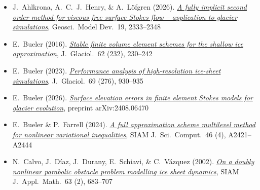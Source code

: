 
\let\plainhref\href
\renewcommand{\href}[2]{\plainhref{#1}{\textcolor{icBlue}{#2}}}

\setlength{\leftmargini}{1em}  %
\begin{itemize}\setlength{\itemsep}{2pt}
\footnotesize
\item J.~Ahlkrona, A.~C.~J.~Henry, \& A.~L\"ofgren (2026). \href{https://doi.org/10.5194/gmd-19-2333-2026}{\emph{A fully implicit second order method for viscous free surface Stokes flow -- application to glacier simulations}}, Geosci.~Model Dev.~19, 2333--2348

\item E.~Bueler (2016). \href{https://doi.org/10.1017/jog.2015.3}{\emph{Stable finite volume element schemes for the shallow ice approximation}}, J.~Glaciol.~62 (232), 230--242


\item E.~Bueler (2023). \href{https://doi.org/10.1017/jog.2022.113}{\emph{Performance analysis of high-resolution ice-sheet simulations}}, J.~Glaciol.~69 (276), 930--935

\item E.~Bueler (2026). \href{https://arxiv.org/abs/2408.06470}{\emph{Surface elevation errors in finite element Stokes models for glacier evolution}}, preprint arXiv:2408.06470

\item E.~Bueler \& P.~Farrell (2024). \href{https://doi.org/10.1137/23m1594200}{\emph{A full approximation scheme multilevel method for nonlinear variational inequalities}}, SIAM J.~Sci.~Comput.~46 (4), A2421--A2444

\item N.~Calvo, J.~D\'iaz, J.~Durany, E.~Schiavi, \& C.~V\'azquez (2002). \href{https://doi.org/10.1137/S0036139901385345}{\emph{On a doubly nonlinear parabolic obstacle problem modelling ice sheet dynamics}}, SIAM J.~Appl.~Math.~63 (2), 683--707



\end{itemize}
